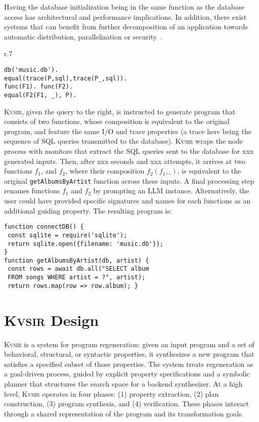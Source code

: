 \documentclass[sigplan]{acmart}
\newcommand{\sys}{{\scshape Kv{\textalpha}sir}\xspace}
\newcommand{\heading}[1]{\vspace{2pt}\noindent\textbf{\emph{#1}}:\enspace}
\newcommand{\ttt}[1]{\texttt{#1}}
\newcommand{\xxx}{\colorbox{red!30}{xxx}\xspace}
\begin{document}
Having the database initialization being in the same function as 
the database access has architectural and performance implications.
In addition, there exist systems that can benefit from further decomposition
of an application towards automatic distribution, parallelization or security~\cite{Towards_Modern_Ghemaw_2023, vasilakis2019ignis, vasilakis2018breakapp}.
\begin{wrapfigure}[5]{r}{.7\columnwidth}
  \vspace{-10pt}
  \begin{verbatim}
db('music.db').
equal(trace(P,sql),trace(P_,sql)).
func(F1). func(F2).
equal(F2(F1, _), P).
\end{verbatim}
\end{wrapfigure}
\sys, given the query to the right, is instructed 
to generate program that consists of two functions,
whose composition is equivalent to the original program, and feature 
the same I/O and trace properties (a trace here being the sequence of SQL 
queries transmitted to the database).
\sys wraps the node process with monitors that extract the SQL queries 
sent to the database for \xxx generated inputs.
Then, after \xxx seconds and \xxx attempts, it arrives at two functions $f_1$, and 
$f_2$, where their composition $f_2(f_1, \_)$, is equivalent to the original \ttt{getAlbumsByArtist} function across these inputs.
A final processing step renames functions $f_1$ and $f_2$ by prompting an LLM instance.
Alternatively, the user could have provided specific signatures and names for each 
functions as an additional guiding property.
The resulting program is:
\begin{verbatim}
function connectDB() {
 const sqlite = require('sqlite');
 return sqlite.open({filename: 'music.db'}); 
}
function getAlbumsByArtist(db, artist) {
 const rows = await db.all("SELECT album
 FROM songs WHERE artist = ?", artist);
 return rows.map(row => row.album); }
\end{verbatim}


\section{\sys Design}

\sys is a system for program regeneration: given an input program and a set of
behavioral, structural, or syntactic properties, it synthesizes a new program
that satisfies a specified subset of those properties. The system treats
regeneration as a goal-driven process, guided by explicit property
specifications and a symbolic planner that structures the search space for a
backend synthesizer.
At a high level, \sys operates in four phases: (1) property extraction, (2)
plan construction, (3) program synthesis, and (4) verification. These phases
interact through a shared representation of the program and its transformation
goals.
\end{document}
